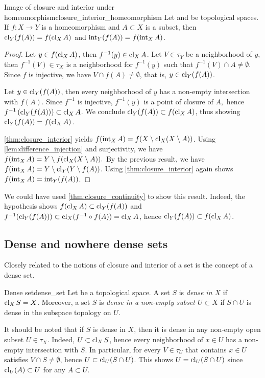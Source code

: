 \begin{theorem}{Image of closure and interior under homeomorphism}{closure_interior_homeomorphism}
    Let  and  be topological spaces. If \(f : X \to Y\) is a homeomorphism and \(A \subset X\) is a subset, then \(\operatorname{cl}_Y(f(A)) = f(\operatorname{cl}_XA)\) and \(\operatorname{int}_Y(f(A)) = f(\operatorname{int}_XA)\).
\end{theorem}
\begin{proof}
    Let \(y \in f(\operatorname{cl}_XA)\), then \(f^{-1}(y) \in \operatorname{cl}_X A\). Let \(V \in \tau_Y\) be a neighborhood of \(y\), then \(f^{-1}(V) \in \tau_X\) is a neighborhood for \(f^{-1}(y)\) such that \(f^{-1}(V) \cap A \neq \emptyset\). Since \(f\) is injective, we have \(V \cap f(A) \neq \emptyset\), that is, \(y \in \operatorname{cl}_Y(f(A))\).

    Let \(y \in \operatorname{cl}_Y(f(A))\), then every neighborhood of \(y\) has a non-empty intersection with \(f(A)\). Since \(f^{-1}\) is injective, \(f^{-1}(y)\) is a point of closure of \(A,\) hence \(f^{-1}\left(\operatorname{cl}_Y(f(A))\right) \subset \operatorname{cl}_XA\). We conclude \(\operatorname{cl}_Y(f(A)) \subset f(\operatorname{cl}_XA)\), thus showing \(\operatorname{cl}_Y(f(A)) = f(\operatorname{cl}_XA)\).

    \cref{thm:closure_interior} yields \(f(\operatorname{int}_XA) = f(X \setminus \operatorname{cl}_X(X\setminus A))\). Using \cref{lem:difference_injection} and surjectivity, we have \(f(\operatorname{int}_XA) = Y \setminus f(\operatorname{cl}_X(X\setminus A)).\) By the previous result, we have \(f(\operatorname{int}_XA) = Y \setminus \operatorname{cl}_Y(Y \setminus f(A))\). Using \cref{thm:closure_interior} again shows \(f(\operatorname{int}_XA) = \operatorname{int}_Y(f(A))\).
\end{proof}
\begin{remark}
    We could have used \cref{thm:closure_continuity} to show this result. Indeed, the hypothesis shows \(f(\operatorname{cl}_XA) \subset \operatorname{cl}_Y(f(A))\) and \(f^{-1}(\operatorname{cl}_Y(f(A))) \subset \operatorname{cl}_X(f^{-1}\circ f(A)) = \operatorname{cl}_XA\), hence \(\operatorname{cl}_Y(f(A)) \subset f(\operatorname{cl}_XA)\).
\end{remark}

\subsection{Dense and nowhere dense sets}
Closely related to the notions of closure and interior of a set is the concept of a dense set.
\begin{definition}{Dense set}{dense_set}
    Let  be a topological space. A set \(S\) is \emph{dense in \(X\)} if \(\operatorname{cl}_X S = X\). Moreover, a set \(S\) is \emph{dense in a non-empty subset \(U \subset X\)} if \(S \cap U\) is dense in the subspace topology on \(U\).
\end{definition}
\begin{remark}
    It should be noted that if \(S\) is dense in \(X\), then it is dense in any non-empty open subset \(U \in \tau_X\). Indeed, \(U \subset \operatorname{cl}_X S\), hence every neighborhood of \(x \in U\) has a non-empty intersection with \(S\). In particular, for every \(V \in \tau_U\) that contains \(x \in U\) satisfies \(V \cap S \neq \emptyset\), hence \(U \subset \operatorname{cl}_U(S \cap U)\). This shows \(U = \operatorname{cl}_U(S\cap U)\) since \(\operatorname{cl}_U(A) \subset U\) for any \(A \subset U\).
\end{remark}

